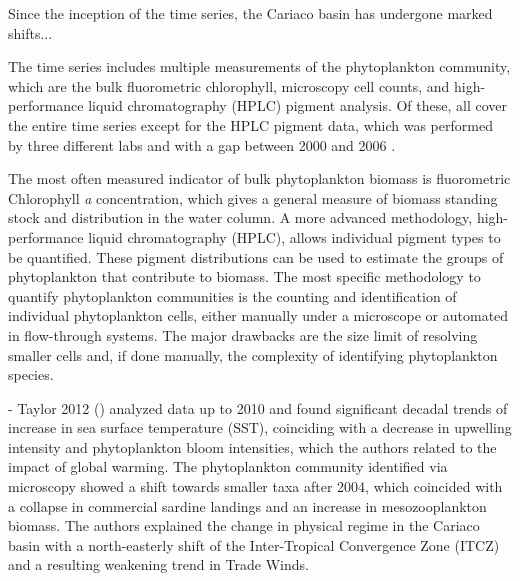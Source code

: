 

    
    
    Since the inception of the time series, the Cariaco basin has undergone marked shifts...

    The time series includes multiple measurements of the phytoplankton community, which are the bulk fluorometric chlorophyll, microscopy cell counts, and high-performance liquid chromatography (HPLC) pigment analysis. Of these, all cover the entire time series except for the HPLC pigment data, which was performed by three different labs and with a gap between 2000 and 2006 \cite{muller-karger_scientific_2019}. 

    The most often measured indicator of bulk phytoplankton biomass is fluorometric Chlorophyll \textit{a} concentration, which gives a general measure of biomass standing stock and distribution in the water column. A more advanced methodology, high-performance liquid chromatography (HPLC), allows individual pigment types to be quantified. These pigment distributions can be used to estimate the groups of phytoplankton that contribute to biomass. The most specific methodology to quantify phytoplankton communities is the counting and identification of individual phytoplankton cells, either manually under a microscope or automated in flow-through systems. The major drawbacks are the size limit of resolving smaller cells and, if done manually, the complexity of identifying phytoplankton species. 


    - Taylor 2012 ()
     analyzed data up to 2010 and found significant decadal trends of increase in sea surface temperature (SST), coinciding with a decrease in upwelling intensity and phytoplankton bloom intensities, which the authors related to the impact of global warming. The phytoplankton community identified via microscopy showed a shift towards smaller taxa after 2004, which coincided with a collapse in commercial sardine landings and an increase in mesozooplankton biomass. The authors explained the change in physical regime in the Cariaco basin with a north-easterly shift of the Inter-Tropical Convergence Zone (ITCZ) and a resulting weakening trend in Trade Winds.
    
